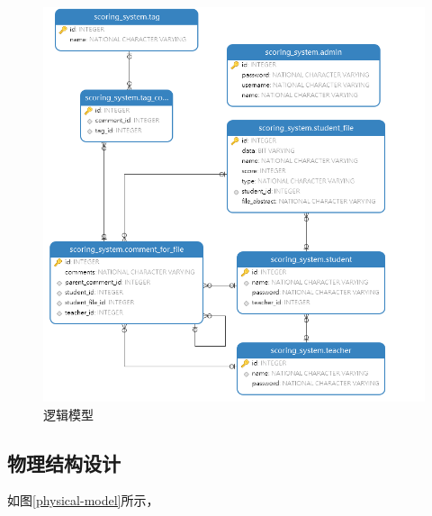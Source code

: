 \begin{figure}[htbp]
    \centering
    \includegraphics[scale = 0.5]{out/uml/数据库/logical-model.png}
    \caption{\song\wuhao 逻辑模型}
    \label{logical-model}
\end{figure}

\subsection{物理结构设计}

如图\ref{physical-model}所示，

